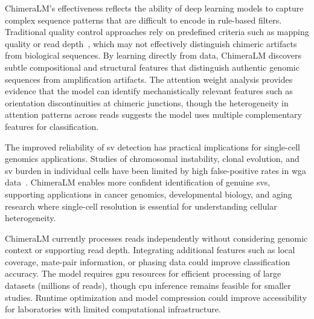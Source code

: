 \documentclass[pdflatex,sn-nature,lineno]{sn-jnl}%
\theoremstyle{thmstyleone}%
\theoremstyle{thmstyletwo}%
\theoremstyle{thmstylethree}%
\begin{document}
ChimeraLM's effectiveness reflects the ability of deep learning models to capture complex sequence patterns that are difficult to encode in rule-based filters.
Traditional quality control approaches rely on predefined criteria such as mapping quality or read depth~\cite{kiguchi2021longread, lu2023exploration}, which may not effectively distinguish chimeric artifacts from biological sequences.
By learning directly from data, ChimeraLM discovers subtle compositional and structural features that distinguish authentic genomic sequences from amplification artifacts.
The attention weight analysis provides evidence that the model can identify mechanistically relevant features such as orientation discontinuities at chimeric junctions, though the heterogeneity in attention patterns across reads suggests the model uses multiple complementary features for classification.

The improved reliability of \gls{sv} detection has practical implications for single-cell genomics applications. Studies of chromosomal instability, clonal evolution, and \gls{sv} burden in individual cells have been limited by high false-positive rates in \gls{wga} data~\cite{kosugi2019comprehensive, mahmoud2019structural}.
ChimeraLM enables more confident identification of genuine \glspl{sv}, supporting applications in cancer genomics, developmental biology, and aging research where single-cell resolution is essential for understanding cellular heterogeneity.


ChimeraLM currently processes reads independently without considering genomic context or supporting read depth.
Integrating additional features such as local coverage, mate-pair information, or phasing data could improve classification accuracy.
The model requires \gls{gpu} resources for efficient processing of large datasets (millions of reads), though \gls{cpu} inference remains feasible for smaller studies.
Runtime optimization and model compression could improve accessibility for laboratories with limited computational infrastructure.
\end{document}

